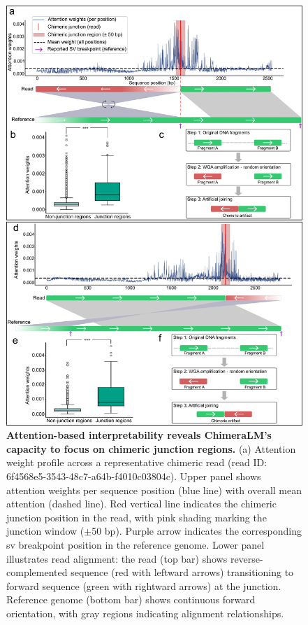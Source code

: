 \documentclass[pdflatex,sn-nature]{sn-jnl}%
\theoremstyle{thmstyleone}%
\theoremstyle{thmstyletwo}%
\theoremstyle{thmstylethree}%
\begin{document}
\begin{figure}[!ht]
	\begin{center}
		\includegraphics[width=\textwidth]{final_figures/figure4}
	\end{center}
	\caption{{\bf Attention-based interpretability reveals ChimeraLM's capacity to focus on chimeric junction regions.}
		(a) Attention weight profile across a representative chimeric read (read ID: 6f4568e5-3543-48c7-a64b-f4010c03804c). Upper panel shows attention weights per sequence position (blue line) with overall mean attention (dashed line). Red vertical line indicates the chimeric junction position in the read, with pink shading marking the junction window ($\pm$50 bp). Purple arrow indicates the corresponding \gls{sv} breakpoint position in the reference genome. Lower panel illustrates read alignment: the read (top bar) shows reverse-complemented sequence (red with leftward arrows) transitioning to forward sequence (green with rightward arrows) at the junction. Reference genome (bottom bar) shows continuous forward orientation, with gray regions indicating alignment relationships.
}
\end{figure}
\end{document}
